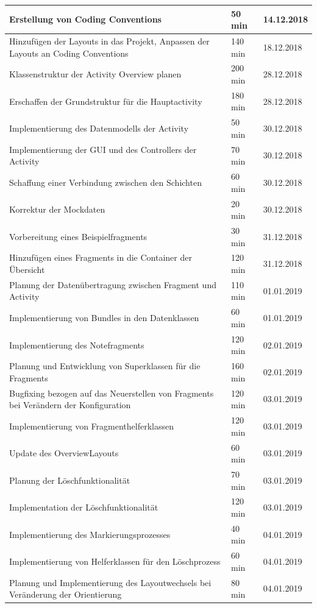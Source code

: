 \begin{longtable}{|p{10cm}|p{2cm}|p{2cm}|}
Erstellung von Coding Conventions & 50 min & 14.12.2018\\ \hline 
Hinzufügen der Layouts in das Projekt, Anpassen der Layouts an Coding Conventions & 140 min & 18.12.2018\\ \hline 
Klassenstruktur der Activity Overview planen & 200 min & 28.12.2018\\ \hline 
Erschaffen der Grundstruktur für die Hauptactivity & 180 min & 28.12.2018\\ \hline 
Implementierung des Datenmodells der Activity & 50 min & 30.12.2018\\ \hline 
Implementierung der GUI und des Controllers der Activity & 70 min & 30.12.2018\\ \hline 
Schaffung einer Verbindung zwischen den Schichten & 60 min & 30.12.2018\\ \hline 
Korrektur der Mockdaten & 20 min & 30.12.2018\\ \hline 
Vorbereitung eines Beispielfragments & 30 min & 31.12.2018\\ \hline 
Hinzufügen eines Fragments in die Container der Übersicht & 120 min & 31.12.2018\\ \hline 
Planung der Datenübertragung zwischen Fragment und Activity & 110 min & 01.01.2019\\ \hline 
Implementierung von Bundles in den Datenklassen & 60 min & 01.01.2019\\ \hline 
Implementierung des Notefragments & 120 min & 02.01.2019\\ \hline 
Planung und Entwicklung von Superklassen für die Fragments  & 160 min & 02.01.2019\\ \hline 
Bugfixing bezogen auf das Neuerstellen von Fragments bei Verändern der Konfiguration & 120 min & 03.01.2019\\ \hline 
Implementierung von Fragmenthelferklassen & 120 min & 03.01.2019\\ \hline 
Update des OverviewLayouts & 60 min & 03.01.2019\\ \hline 
Planung der Löschfunktionalität & 70 min & 03.01.2019\\ \hline 
Implementation der Löschfunktionalität & 120 min & 03.01.2019\\ \hline 
Implementierung des Markierungsprozesses & 40 min & 04.01.2019\\ \hline 
Implementierung von Helferklassen für den Löschprozess & 60 min & 04.01.2019\\ \hline 
Planung und Implementierung des Layoutwechsels bei Veränderung der Orientierung & 80 min & 04.01.2019\\ \hline 

\end{longtable}
